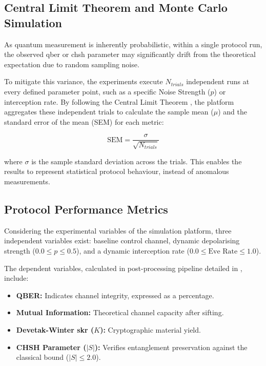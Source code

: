 \subsection{Central Limit Theorem and Monte Carlo Simulation}
\label{subsec:clt_monte_carlo}

As quantum measurement is inherently probabilistic, within a single protocol run, the observed \gls{qber} or \gls{chsh} parameter may significantly drift from the theoretical expectation due to random sampling noise. 

To mitigate this variance, the experiments execute $N_{trials}$ independent runs at every defined parameter point, such as a specific Noise Strength ($p$) or interception rate. By following the Central Limit Theorem \cite{montgomery2018}, the platform aggregates these independent trials to calculate the sample mean ($\mu$) and the standard error of the mean (SEM) for each metric:

\begin{equation}
\text{SEM} = \frac{\sigma}{\sqrt{N_{trials}}}
\label{eq:sem}
\end{equation}

where $\sigma$ is the sample standard deviation across the trials. This enables the results to represent statistical protocol behaviour, instead of anomalous measurements. 

\subsection{Protocol Performance Metrics}
\label{subsec:performance_metrics}

Considering the experimental variables of the simulation platform, three independent variables exist: baseline control channel, dynamic depolarising strength ($0.0 \leq p \leq 0.5$), and a dynamic interception rate ($0.0 \leq \text{Eve Rate} \leq 1.0$). 

The dependent variables, calculated in post-processing pipeline detailed in , include:

\begin{itemize}
    \item \textbf{QBER:} Indicates channel integrity, expressed as a percentage.
    \item \textbf{Mutual Information:} Theoretical channel capacity after \gls{sifting}.
    \item \textbf{Devetak-Winter \gls{skr} ($K$):} Cryptographic material yield.
    \item \textbf{CHSH Parameter ($|S|$):} Verifies \gls{entanglement} preservation against the classical bound ($|S| \leq 2.0$).
\end{itemize}


